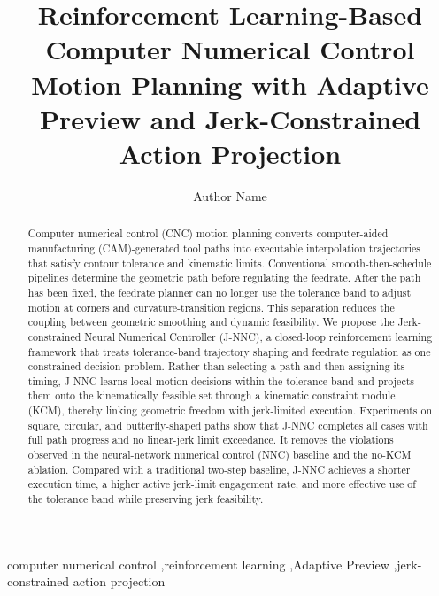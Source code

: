 \documentclass[preprint,12pt]{elsarticle}
\begin{document}
\begin{frontmatter}

\title{Reinforcement Learning-Based Computer Numerical Control Motion Planning with Adaptive Preview and Jerk-Constrained Action Projection}

\author[1]{Author Name}

\begin{abstract}
Computer numerical control (CNC) motion planning converts computer-aided manufacturing (CAM)-generated tool paths into executable interpolation trajectories that satisfy contour tolerance and kinematic limits. Conventional smooth-then-schedule pipelines determine the geometric path before regulating the feedrate. After the path has been fixed, the feedrate planner can no longer use the tolerance band to adjust motion at corners and curvature-transition regions. This separation reduces the coupling between geometric smoothing and dynamic feasibility. We propose the Jerk-constrained Neural Numerical Controller (J-NNC), a closed-loop reinforcement learning framework that treats tolerance-band trajectory shaping and feedrate regulation as one constrained decision problem. Rather than selecting a path and then assigning its timing, J-NNC learns local motion decisions within the tolerance band and projects them onto the kinematically feasible set through a kinematic constraint module (KCM), thereby linking geometric freedom with jerk-limited execution. Experiments on square, circular, and butterfly-shaped paths show that J-NNC completes all cases with full path progress and no linear-jerk limit exceedance. It removes the violations observed in the neural-network numerical control (NNC) baseline and the no-KCM ablation. Compared with a traditional two-step baseline, J-NNC achieves a shorter execution time, a higher active jerk-limit engagement rate, and more effective use of the tolerance band while preserving jerk feasibility.
\end{abstract}

\begin{keyword}
computer numerical control \sep reinforcement learning \sep Adaptive Preview \sep jerk-constrained action projection
\end{keyword}

\end{frontmatter}
\end{document}
